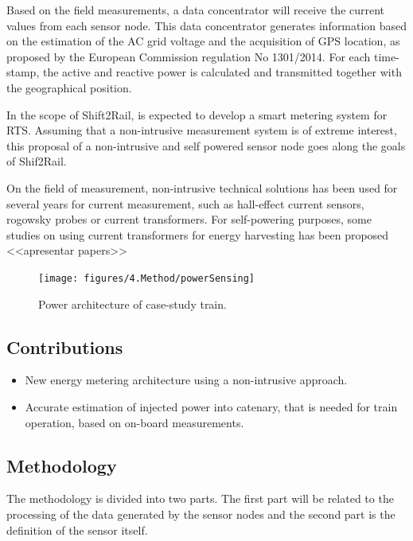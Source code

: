 Based on the field measurements, a data concentrator will receive the current values from each sensor node. This data concentrator generates information based on the estimation of the AC grid voltage and the acquisition of GPS location, as proposed by the European Commission regulation No 1301/2014. For each time-stamp, the active and reactive power is calculated and transmitted together with the geographical position.

In the scope of Shift2Rail, is expected to develop a smart metering system for RTS. Assuming that a non-intrusive measurement system is of extreme interest, this proposal of a non-intrusive and self powered sensor node goes along the goals of Shif2Rail.

On the field of measurement, non-intrusive technical solutions has been used for several years for current measurement, such as hall-effect current sensors, rogowsky probes or current transformers.
For self-powering purposes, some studies on using current transformers for energy harvesting has been proposed <<apresentar papers>>


\begin{figure}[h!]
	\centering
	\vspace{-1em}
	\texttt{[image: figures/4.Method/powerSensing]}
	\caption{Power architecture of case-study train.}
	\label{fig:4.powerSensing}
\end{figure}



\subsection{Contributions}

\begin{itemize}
	\setlength\itemsep{0em}
	\item New energy metering architecture using a non-intrusive approach.
	
	\item Accurate estimation of injected power into catenary, that is needed for train operation, based on on-board measurements.

\end{itemize}


\subsection{Methodology}

The methodology is divided into two parts. The first part will be related to the processing of the data generated by the sensor nodes and the second part is the definition of the sensor itself.

